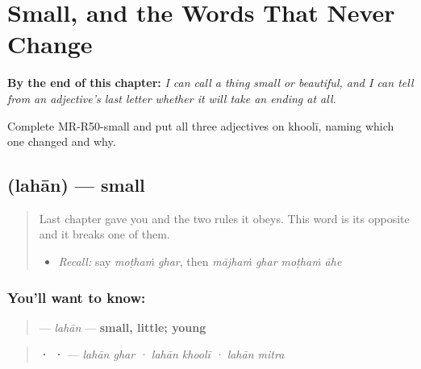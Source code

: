 
\chapter{Small, and the Words That Never Change}
\label{ch:mr-invariable-adjectives}

\begin{chapteropening}
\textbf{By the end of this chapter:} \emph{I can call a thing small or beautiful, and I can tell from an adjective's last letter whether it will take an ending at all.}

Complete MR-R50-small and put all three adjectives on khoolī, naming which one changed and why.
\end{chapteropening}

\section[\texorpdfstring{\mr{लहान} (lahān)}{लहान (lahān)}]{ (lahān) — small}

\label{lesson:MR-C50-lahaan}



\begin{quote}
Last chapter gave you \textbf{} and the two rules it obeys. This word is its opposite and it breaks one of them.

\begin{itemize}
\raggedright
  \item \emph{Recall:} say \emph{moṭhaṁ ghar}, then \emph{mājhaṁ ghar moṭhaṁ āhe}
\end{itemize}
\end{quote}

\subsection*{You'll want to know: }
\begin{quote}
\textbf{} — \emph{lahān} — \textbf{small, little; young}
\end{quote}

\begin{quote}
\textbf{  ·   ·  } — \emph{lahān ghar · lahān khoolī · lahān mitra}
\end{quote}

